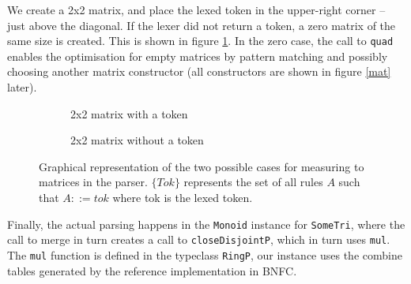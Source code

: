 \documentclass[a4paper,12pt,notitlepage]{report}
\begin{document}
We create a 2x2 matrix, and place the lexed token in the upper-right corner
-- just above the diagonal. If the lexer did not return a token, a zero matrix
of the same size is created. This is shown in figure \ref{measurematrix}. In the
zero case, the call to \texttt{quad} enables the optimisation for empty matrices
by pattern matching and possibly choosing another matrix constructor (all
constructors are shown in figure \ref{mat} later).

\begin{figure}[H]
\begin{subfigure}[H]{.45\textwidth}
    \centering
\caption{2x2 matrix with a token}
\end{subfigure}
\hfill
\begin{subfigure}[H]{.45\textwidth}
    \centering
\caption{2x2 matrix without a token}
\end{subfigure}
\caption{\label{measurematrix} Graphical representation of the two possible
cases for measuring to matrices in the parser. $\{Tok\}$ represents the set of all
rules $A$ such that $A ::= tok$ where tok is the lexed token.}
\end{figure}

Finally, the actual parsing happens in the \texttt{Monoid} instance for
\texttt{SomeTri}, where the call to merge in turn creates a call to
\texttt{closeDisjointP}, which in turn uses \texttt{mul}. The \texttt{mul}
function is defined in the typeclass \texttt{RingP}, our instance uses the
combine tables generated by the reference implementation in BNFC.
\end{document}
